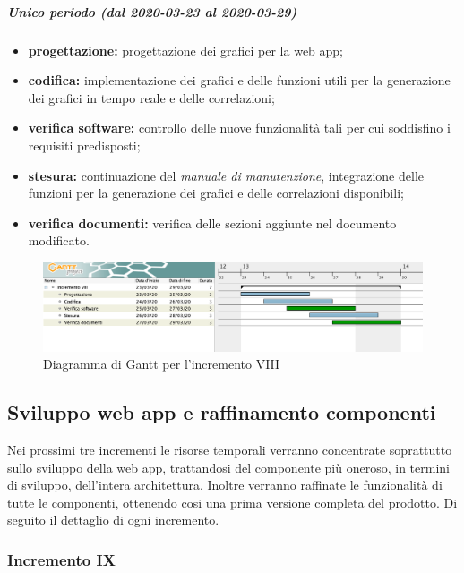 				\subparagraph{Unico periodo (dal 2020-03-23 al 2020-03-29)}
				
					\begin{itemize}
						\item \textbf{progettazione:} progettazione dei grafici per la web app;
						\item \textbf{codifica:} implementazione dei grafici e delle funzioni utili per la generazione dei grafici in tempo reale e delle correlazioni;
						\item \textbf{verifica software:} controllo delle nuove funzionalità tali per cui soddisfino i requisiti predisposti;
						\item \textbf{stesura:} continuazione del \textit{manuale di manutenzione}, integrazione delle funzioni per la generazione dei grafici e delle correlazioni disponibili;
						\item \textbf{verifica documenti:} verifica delle sezioni aggiunte nel documento modificato.
					\end{itemize} 			

		\begin{landscape}
          \begin{figure}[H]
            \centering
            \includegraphics[width=\linewidth]{images/gantt/incrementoVIII} %
            \caption{Diagramma di Gantt per l'incremento VIII}
          \end{figure}		
		\end{landscape}

		\subsection{Sviluppo web app e raffinamento componenti}
		Nei prossimi tre incrementi le risorse temporali verranno concentrate soprattutto sullo sviluppo della web app, trattandosi del componente più oneroso, in termini di sviluppo, dell'intera architettura. Inoltre verranno raffinate le funzionalità di tutte le componenti, ottenendo cosi una prima versione completa del prodotto.
		Di seguito il dettaglio di ogni incremento.

		\subsubsection{Incremento IX}
			
